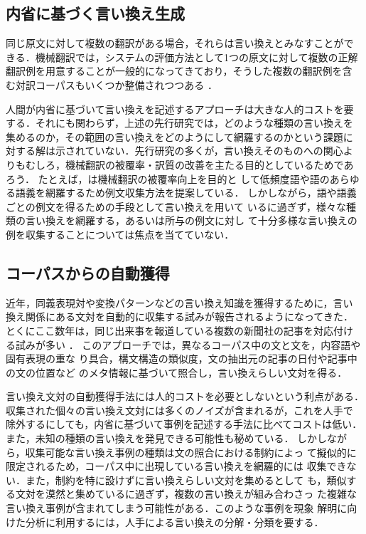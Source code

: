 \subsection{内省に基づく言い換え生成}
\label{ssec:manual}

同じ原文に対して複数の翻訳がある場合，それらは言い換えとみなすことがで
きる．機械翻訳では，システムの評価方法として1つの原文に対して複数の正解
翻訳例を用意することが一般的になってきており，そうした複数の翻訳例を含
む対訳コーパスもいくつか整備されつつある
\cite{shirai:01:a,shirai:01:b,zhang:01,kinjo:03,shimohata:03:b}．

人間が内省に基づいて言い換えを記述するアプローチは大きな人的コストを要
する．それにも関わらず，上述の先行研究では，どのような種類の言い換えを
集めるのか，その範囲の言い換えをどのようにして網羅するのかという課題に
対する解は示されていない．先行研究の多くが，言い換えそのものへの関心よ
りもむしろ，機械翻訳の被覆率・訳質の改善を主たる目的としているためであ
ろう．
たとえば，\cite{shirai:01:a,shirai:01:b}は機械翻訳の被覆率向上を目的と
して低頻度語や語のあらゆる語義を網羅するため例文収集方法を提案している．
しかしながら，語や語義ごとの例文を得るための手段として言い換えを用いて
いるに過ぎず，様々な種類の言い換えを網羅する，あるいは所与の例文に対し
て十分多様な言い換えの例を収集することについては焦点を当てていない．

\subsection{コーパスからの自動獲得}
\label{ssec:automatic}

近年，同義表現対や変換パターンなどの言い換え知識を獲得するために，言い
換え関係にある文対を自動的に収集する試みが報告されるようになってきた．
とくにここ数年は，同じ出来事を報道している複数の新聞社の記事を対応付け
る試みが多い
\cite{barzilay:03:a,shinyama:03,quirk:04,dolan:04,dolan:05,brockett:05}
．
このアプローチでは，異なるコーパス中の文と文を，内容語や固有表現の重な
り具合，構文構造の類似度，文の抽出元の記事の日付や記事中の文の位置など
のメタ情報に基づいて照合し，言い換えらしい文対を得る．

言い換え文対の自動獲得手法には人的コストを必要としないという利点がある．
収集された個々の言い換え文対には多くのノイズが含まれるが，これを人手で
除外するにしても，内省に基づいて事例を記述する手法に比べてコストは低い．
また，未知の種類の言い換えを発見できる可能性も秘めている．
しかしながら，収集可能な言い換え事例の種類は文の照合における制約によっ
て擬似的に限定されるため，コーパス中に出現している言い換えを網羅的には
収集できない．また，制約を特に設けずに言い換えらしい文対を集めるとして
も，類似する文対を漠然と集めているに過ぎず，複数の言い換えが組み合わさっ
た複雑な言い換え事例が含まれてしまう可能性がある．このような事例を現象
解明に向けた分析に利用するには，人手による言い換えの分解・分類を要する．


